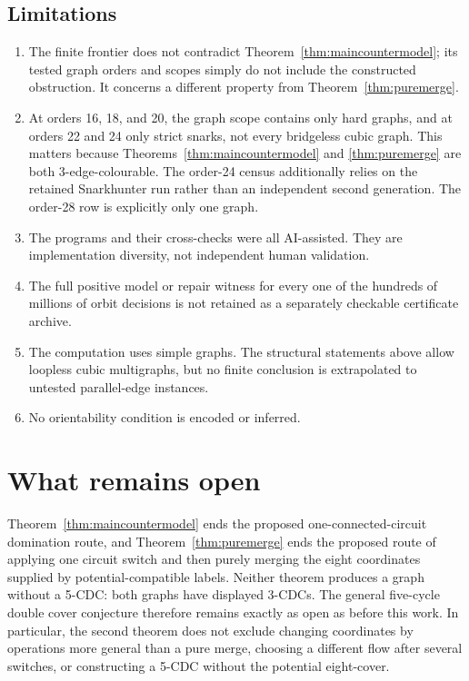 \documentclass[11pt]{article}
\theoremstyle{definition}
\theoremstyle{remark}
\begin{document}
\subsection*{Limitations}

\begin{enumerate}
  \item The finite frontier does not contradict
        Theorem~\ref{thm:maincountermodel}; its tested graph orders and
        scopes simply do not include the constructed obstruction.  It
        concerns a different property from
        Theorem~\ref{thm:puremerge}.
  \item At orders 16, 18, and 20, the graph scope contains only hard
        graphs, and at orders 22 and 24 only strict snarks, not every
        bridgeless cubic graph.  This matters because
        Theorems~\ref{thm:maincountermodel} and \ref{thm:puremerge} are
        both 3-edge-colourable.
        The order-24 census additionally relies on the retained
        Snarkhunter run rather than an independent second generation.
        The order-28 row is explicitly only one graph.
  \item The programs and their cross-checks were all AI-assisted.  They
        are implementation diversity, not independent human validation.
  \item The full positive model or repair witness for every one of the
        hundreds of millions of orbit decisions is not retained as a
        separately checkable certificate archive.
  \item The computation uses simple graphs.  The structural statements
        above allow loopless cubic multigraphs, but no finite conclusion
        is extrapolated to untested parallel-edge instances.
  \item No orientability condition is encoded or inferred.
\end{enumerate}

\section{What remains open}

Theorem~\ref{thm:maincountermodel} ends the proposed one-connected-circuit
domination route, and Theorem~\ref{thm:puremerge} ends the proposed route
of applying one circuit switch and then purely merging the eight
coordinates supplied by potential-compatible labels.  Neither theorem
produces a graph without a 5-CDC: both graphs have displayed 3-CDCs.
The general five-cycle double cover conjecture therefore remains exactly
as open as before this work.  In particular, the second theorem does not
exclude changing coordinates by operations more general than a pure
merge, choosing a different flow after several switches, or constructing
a 5-CDC without the potential eight-cover.
\end{document}
